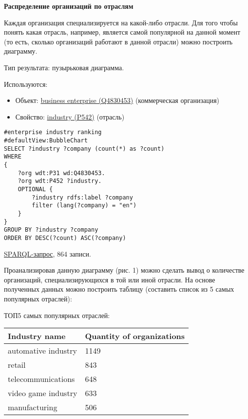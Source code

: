 \textbf{Распределение организаций по отраслям}

Каждая организация специализируется на какой-либо отрасли. Для того чтобы понять какая отрасль, например, является самой популярной на данной момент (то есть, сколько организаций работают в данной отрасли) можно построить диаграмму.

Тип результата: пузырьковая диаграмма. 

Используются:
\begin{itemize}
    \item Объект: \href{https://www.wikidata.org/wiki/Q4830453}{business enterprise (Q4830453)} (коммерческая организация)
    \item Свойство: \href{https://www.wikidata.org/wiki/Property:P452}{industry (P542)} (отрасль)
\end{itemize}

\begin{lstlisting}[language=SPARQL]
#enterprise industry ranking
#defaultView:BubbleChart
SELECT ?industry ?company (count(*) as ?count)
WHERE 
{
    ?org wdt:P31 wd:Q4830453.
    ?org wdt:P452 ?industry.
    OPTIONAL {
		?industry rdfs:label ?company
		filter (lang(?company) = "en")
	}
}
GROUP BY ?industry ?company
ORDER BY DESC(?count) ASC(?company)
\end{lstlisting}

\href{https://query.wikidata.org/#%23enterprise%20industry%20ranking%0A%23defaultView%3ABubbleChart%0ASELECT%20%3Findustry%20%3Fcompany%20%28count%28%2a%29%20as%20%3Fcount%29%0AWHERE%20%0A%7B%0A%20%20%20%20%3Forg%20wdt%3AP31%20wd%3AQ4830453.%0A%20%20%20%20%3Forg%20wdt%3AP452%20%3Findustry%20.%0A%20%20%20%20OPTIONAL%20%7B%0A%09%09%3Findustry%20rdfs%3Alabel%20%3Fcompany%0A%09%09filter%20%28lang%28%3Fcompany%29%20%3D%20%22en%22%29%0A%09%7D%0A%7D%0AGROUP%20BY%20%3Findustry%20%3Fcompany%0AORDER%20BY%20DESC%28%3Fcount%29%20ASC%28%3Fcompany%29%0A}{SPARQL-запрос}, 864 записи.

Проанализировав данную диаграмму (рис. 1) можно сделать вывод о количестве организаций, специализирующихся в той или иной отрасли. На основе полученных данных можно построить таблицу (составить список из 5 самых популярных отраслей):

\hfill

ТОП5 самых популярных отраслей: \\
\begin{tabular}{|l|l|}
\hline
\textbf{Industry name} & \textbf{Quantity of organizations} \\
\hline
automative industry & 1149 \\	
\hline
retail & 843 \\
\hline
telecommunications & 648 \\
\hline
video game industry & 633 \\
\hline
manufacturing & 506 \\
\hline
\end{tabular}


